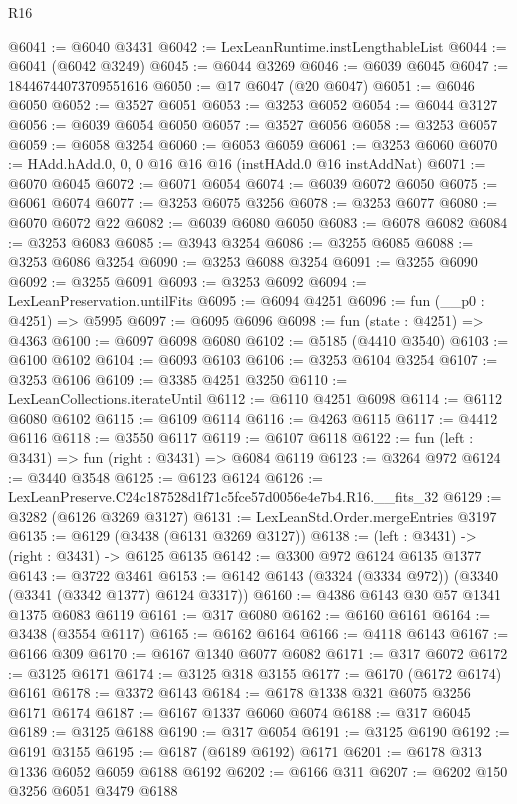 \begin{lexlean}{R16}
\begin{coremodule}
@6041 := @6040 @3431
@6042 := LexLeanRuntime.instLengthableList
@6044 := @6041 (@6042 @3249)
@6045 := @6044 @3269
@6046 := @6039 @6045
@6047 := 18446744073709551616
@6050 := @17 @6047 (@20 @6047)
@6051 := @6046 @6050
@6052 := @3527 @6051
@6053 := @3253 @6052
@6054 := @6044 @3127
@6056 := @6039 @6054 @6050
@6057 := @3527 @6056
@6058 := @3253 @6057
@6059 := @6058 @3254
@6060 := @6053 @6059
@6061 := @3253 @6060
@6070 := HAdd.hAdd.{0, 0, 0} @16 @16 @16 (instHAdd.{0} @16 instAddNat)
@6071 := @6070 @6045
@6072 := @6071 @6054
@6074 := @6039 @6072 @6050
@6075 := @6061 @6074
@6077 := @3253 @6075 @3256
@6078 := @3253 @6077
@6080 := @6070 @6072 @22
@6082 := @6039 @6080 @6050
@6083 := @6078 @6082
@6084 := @3253 @6083
@6085 := @3943 @3254
@6086 := @3255 @6085
@6088 := @3253 @6086 @3254
@6090 := @3253 @6088 @3254
@6091 := @3255 @6090
@6092 := @3255 @6091
@6093 := @3253 @6092
@6094 := LexLeanPreservation.untilFits
@6095 := @6094 @4251
@6096 := fun (__p0 : @4251) => @5995
@6097 := @6095 @6096
@6098 := fun (state : @4251) => @4363
@6100 := @6097 @6098 @6080
@6102 := @5185 (@4410 @3540)
@6103 := @6100 @6102
@6104 := @6093 @6103
@6106 := @3253 @6104 @3254
@6107 := @3253 @6106
@6109 := @3385 @4251 @3250
@6110 := LexLeanCollections.iterateUntil
@6112 := @6110 @4251 @6098
@6114 := @6112 @6080 @6102
@6115 := @6109 @6114
@6116 := @4263 @6115
@6117 := @4412 @6116
@6118 := @3550 @6117
@6119 := @6107 @6118
@6122 := fun (left : @3431) => fun (right : @3431) => @6084 @6119
@6123 := @3264 @972
@6124 := @3440 @3548
@6125 := @6123 @6124
@6126 := LexLeanPreserve.C24c187528d1f71c5fce57d0056e4e7b4.R16.__fits_32
@6129 := @3282 (@6126 @3269 @3127)
@6131 := LexLeanStd.Order.mergeEntries @3197
@6135 := @6129 (@3438 (@6131 @3269 @3127))
@6138 := (left : @3431) -> (right : @3431) -> @6125 @6135
@6142 := @3300 @972 @6124 @6135 @1377
@6143 := @3722 @3461
@6153 := @6142 @6143 (@3324 (@3334 @972)) (@3340 (@3341 (@3342 @1377) @6124 @3317))
@6160 := @4386 @6143 @30 @57 @1341 @1375 @6083 @6119
@6161 := @317 @6080
@6162 := @6160 @6161
@6164 := @3438 (@3554 @6117)
@6165 := @6162 @6164
@6166 := @4118 @6143
@6167 := @6166 @309
@6170 := @6167 @1340 @6077 @6082
@6171 := @317 @6072
@6172 := @3125 @6171
@6174 := @3125 @318 @3155
@6177 := @6170 (@6172 @6174) @6161
@6178 := @3372 @6143
@6184 := @6178 @1338 @321 @6075 @3256 @6171 @6174
@6187 := @6167 @1337 @6060 @6074
@6188 := @317 @6045
@6189 := @3125 @6188
@6190 := @317 @6054
@6191 := @3125 @6190
@6192 := @6191 @3155
@6195 := @6187 (@6189 @6192) @6171
@6201 := @6178 @313 @1336 @6052 @6059 @6188 @6192
@6202 := @6166 @311
@6207 := @6202 @150 @3256 @6051 @3479 @6188

\end{coremodule}
\end{lexlean}
